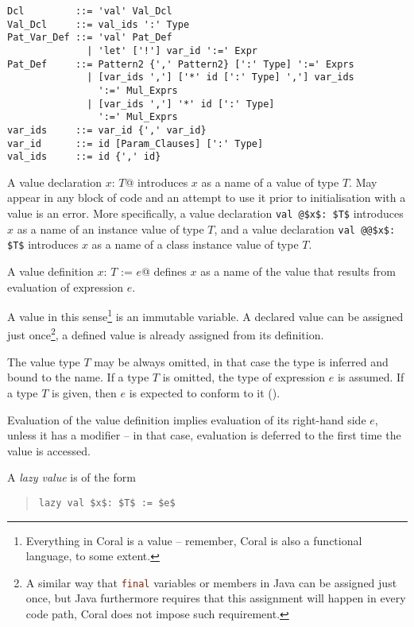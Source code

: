 \syntax\begin{lstlisting}
Dcl         ::= 'val' Val_Dcl
Val_Dcl     ::= val_ids ':' Type
Pat_Var_Def ::= 'val' Pat_Def
              | 'let' ['!'] var_id ':=' Expr
Pat_Def     ::= Pattern2 {',' Pattern2} [':' Type] ':=' Exprs
              | [var_ids ','] ['*' id [':' Type] ','] var_ids 
                ':=' Mul_Exprs
              | [var_ids ','] '*' id [':' Type] 
                ':=' Mul_Exprs
var_ids     ::= var_id {',' var_id}
var_id      ::= id [Param_Clauses] [':' Type]
val_ids     ::= id {',' id}
\end{lstlisting}

A value declaration \lstinline@val $x$: $T$@ introduces $x$ as a name of a value of type $T$. May appear in any block of code and an attempt to use it prior to initialisation with a value is an error. More specifically, a value declaration \lstinline+val @$x$: $T$+ introduces $x$ as a name of an instance value of type $T$, and a value declaration \lstinline+val @@$x$: $T$+ introduces $x$ as a name of a class instance value of type $T$. 

A value definition \lstinline@val $x$: $T$ := $e$@ defines $x$ as a name of the value that results from evaluation of expression $e$.

A value in this sense\footnote{Everything in Coral is a value -- remember, Coral is also a functional language, to some extent.} is an immutable variable. A declared value can be assigned just once\footnote{A similar way that \lstinline[language=Java]@final@ variables or members in Java can be assigned just once, but Java furthermore requires that this assignment will happen in every code path, Coral does not impose such requirement.}, a defined value is already assigned from its definition. 

The value type $T$ may be always omitted, in that case the type is inferred and bound to the name. If a type $T$ is omitted, the type of expression $e$ is assumed. If a type $T$ is given, then $e$ is expected to conform to it (). 

Evaluation of the value definition implies evaluation of its right-hand side $e$, unless it has a modifier  -- in that case, evaluation is deferred to the first time the value is accessed. 

A {\em lazy value} is of the form
\begin{quote}\begin{lstlisting}
lazy val $x$: $T$ := $e$
\end{lstlisting}\end{quote}

